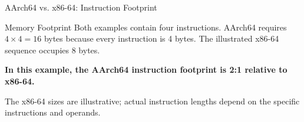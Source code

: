 \documentclass[aspectratio=169,11pt,t]{beamer}
\begin{document}
\begin{frame}{AArch64 vs. x86-64: Instruction Footprint}
\begin{center}
\end{center}

\vspace{0.2cm}

\begin{block}{Memory Footprint}
\small
Both examples contain four instructions. AArch64 requires
\(4 \times 4 = 16\) bytes because every instruction is 4 bytes.
The illustrated x86-64 sequence occupies 8 bytes.

\vspace{0.1cm}

\textbf{In this example, the AArch64 instruction footprint is 2:1 relative to x86-64.}
\end{block}

\vspace{0.05cm}

\scriptsize
The x86-64 sizes are illustrative; actual instruction lengths depend on the
specific instructions and operands.

\end{frame}


\end{document}
